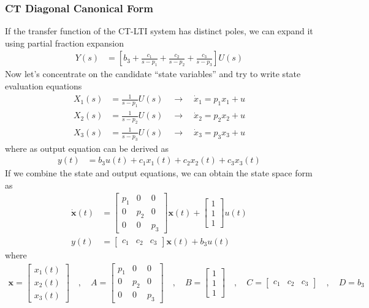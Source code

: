 \documentclass[twoside]{article}
\begin{document}
\subsubsection{CT Diagonal Canonical Form}

If the transfer function of the CT-LTI system 
has distinct poles, we can expand it 
using partial fraction expansion 
%
\begin{align*}
Y(s) &= \left[ b_3 + \frac{c_1}{s - p_1} + \frac{c_2}{s - p_2} 
+ \frac{c_3}{s - p_3} \right] U(s)
\end{align*}
%
Now let's concentrate on the candidate ``state variables''
and try to write state evaluation equations
%
\begin{align*}
X_1(s) &= \frac{1}{s - p_1} U(s) \quad \rightarrow \quad \dot{x}_1 =  p_1 x_1+ u
\\
X_2(s) &= \frac{1}{s - p_2} U(s) \quad \rightarrow \quad \dot{x}_2 = p_2 x_2+ u
\\
X_3(s) &= \frac{1}{s - p_3} U(s) \quad \rightarrow \quad \dot{x}_3 = p_3 x_3 + u
\end{align*}
%
where as output equation can be derived as
%
\begin{align*}
y(t) &= b_3 u(t) + c_1 x_1(t) + c_2 x_2(t) + c_3 x_3(t)
\end{align*}
%
If we combine the state and output equations, we
can obtain the state space form as
%
%
\begin{align*}
  \dot{\mathbf{x}}(t) &= \left[ \begin{array}{ccc} p_1 & 0 & 0\\ 0 & p_2 & 0
    \\ 0 & 0 & p_3 \end{array} \right] \mathbf{x}(t)
   + 
  \left[ \begin{array}{c} 1 \\ 1
    \\ 1 \end{array} \right] u(t)
\\
y(t) &= \left[ \begin{array}{ccc} c_1 & c_2 & c_3 \end{array} \right] \mathbf{x}(t)
+ b_3 u(t)
\end{align*}
%
where 
%
\begin{align*}
\mathbf{x} = \left[ \begin{array}{c} x_1(t) \\ x_2(t) \\
x_3(t) \end{array} \right] \quad , \quad
A = \left[ \begin{array}{ccc} p_1 & 0 & 0 \\ 0 & p_2 & 0
    \\ 0 & 0 & p_3 \end{array} \right]
\quad , \quad 
B = \left[ \begin{array}{c} 1 \\ 1
    \\ 1 \end{array} \right]
\quad , \quad
C = \left[ \begin{array}{ccc} c_1 & c_2 & c_3 \end{array} \right]
\quad , \quad
D = b_3
\end{align*}
%
\end{document}
